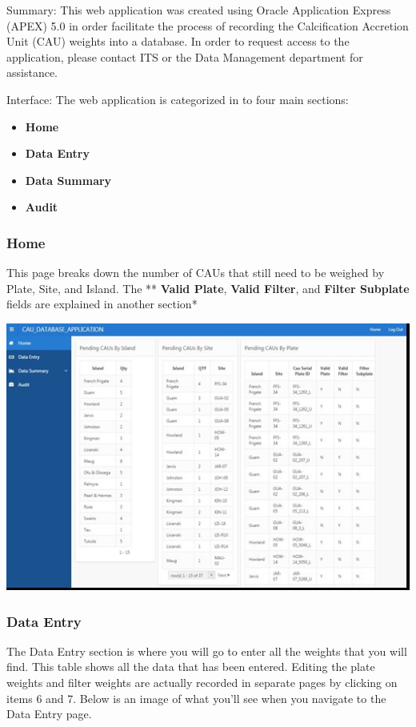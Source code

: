 \documentclass[]{book}
\providecommand{\tightlist}{%
  \setlength{\itemsep}{0pt}\setlength{\parskip}{0pt}}
\begin{document}
Summary: This web application was created using Oracle Application Express (APEX) 5.0 in order facilitate the process of recording the Calcification Accretion Unit (CAU) weights into a database. In order to request access to the application, please contact ITS or the Data Management department for assistance.

Interface: The web application is categorized in to four main sections:

\begin{itemize}
\tightlist
\item
  \textbf{Home}
\item
  \textbf{Data Entry}
\item
  \textbf{Data Summary}
\item
  \textbf{Audit}
\end{itemize}

\hypertarget{home}{%
\subsubsection{Home}\label{home}}

This page breaks down the number of CAUs that still need to be weighed by Plate, Site, and Island. The
** \textbf{Valid Plate}, \textbf{Valid Filter}, and \textbf{Filter Subplate} fields are explained in another section*

\includegraphics{images/Data1.jpg}

\hypertarget{data-entry}{%
\subsubsection{Data Entry}\label{data-entry}}

The Data Entry section is where you will go to enter all the weights that you will find. This table shows all the data that has been entered. Editing the plate weights and filter weights are actually recorded in separate pages by clicking on items 6 and 7. Below is an image of what you'll see when you navigate to the Data Entry page.
\end{document}

